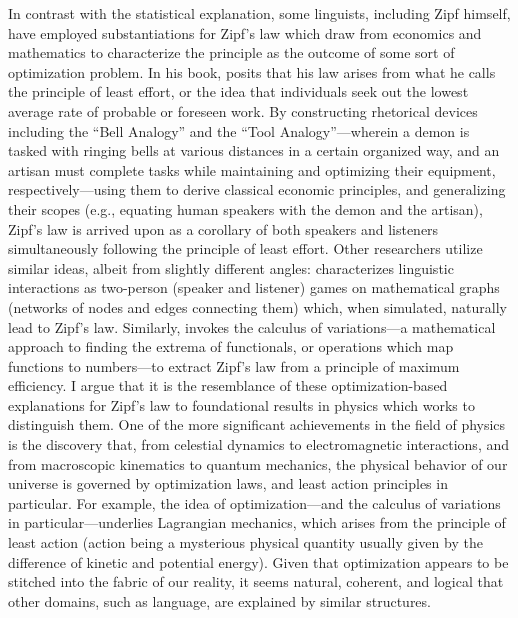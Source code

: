 \documentclass[10pt]{article}
\begin{document}
\begin{flushleft}
    \hspace*{0.5in} In contrast with the statistical explanation, some linguists, including Zipf himself, have employed substantiations for Zipf's law which draw from economics and mathematics to characterize the principle as the outcome of some sort of optimization problem. In his book, \textcite{zipf} posits that his law arises from what he calls the principle of least effort, or the idea that individuals seek out the lowest average rate of probable or foreseen work. By constructing rhetorical devices including the ``Bell Analogy'' and the ``Tool Analogy''---wherein a demon is tasked with ringing bells at various distances in a certain organized way, and an artisan must complete tasks while maintaining and optimizing their equipment, respectively---using them to derive classical economic principles, and generalizing their scopes (e.g., equating human speakers with the demon and the artisan), Zipf's law is arrived upon as a corollary of both speakers and listeners simultaneously following the principle of least effort. Other researchers utilize similar ideas, albeit from slightly different angles: \textcite{graph} characterizes linguistic interactions as two-person (speaker and listener) games on mathematical graphs (networks of nodes and edges connecting them) which, when simulated, naturally lead to Zipf's law. Similarly, \textcite{physics} invokes the calculus of variations---a mathematical approach to finding the extrema of functionals, or operations which map functions to numbers---to extract Zipf's law from a principle of maximum efficiency. I argue that it is the resemblance of these optimization-based explanations for Zipf's law to foundational results in physics which works to distinguish them. One of the more significant achievements in the field of physics is the discovery that, from celestial dynamics to electromagnetic interactions, and from macroscopic kinematics to quantum mechanics, the physical behavior of our universe is governed by optimization laws, and least action principles in particular. For example, the idea of optimization---and the calculus of variations in particular---underlies Lagrangian mechanics, which arises from the principle of least action (action being a mysterious physical quantity usually given by the difference of kinetic and potential energy). Given that optimization appears to be stitched into the fabric of our reality, it seems natural, coherent, and logical that other domains, such as language, are explained by similar structures.
    

\end{flushleft}
\end{document}
